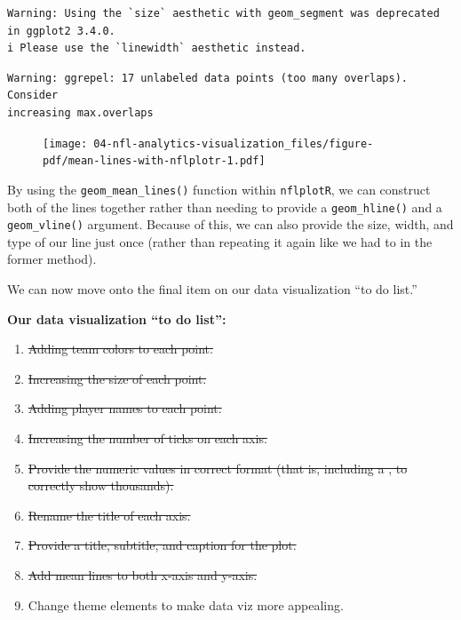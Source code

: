 \documentclass[
  letterpaper,
]{krantz}
\begin{document}
\begin{verbatim}
Warning: Using the `size` aesthetic with geom_segment was deprecated in ggplot2 3.4.0.
i Please use the `linewidth` aesthetic instead.
\end{verbatim}

\begin{verbatim}
Warning: ggrepel: 17 unlabeled data points (too many overlaps). Consider
increasing max.overlaps
\end{verbatim}

\begin{figure}[H]

{\centering \texttt{[image: 04-nfl-analytics-visualization\_files/figure-pdf/mean-lines-with-nflplotr-1.pdf]}

}

\end{figure}

By using the \texttt{geom\_mean\_lines()} function within
\texttt{nflplotR}, we can construct both of the lines together rather
than needing to provide a \texttt{geom\_hline()} and a
\texttt{geom\_vline()} argument. Because of this, we can also provide
the size, width, and type of our line just once (rather than repeating
it again like we had to in the former method).

We can now move onto the final item on our data visualization ``to do
list.''

\begin{tcolorbox}[enhanced jigsaw, left=2mm, toprule=.15mm, opacitybacktitle=0.6, leftrule=.75mm, bottomrule=.15mm, colbacktitle=quarto-callout-note-color!10!white, breakable, colback=white, bottomtitle=1mm, toptitle=1mm, title=\textcolor{quarto-callout-note-color}{\faInfo}\hspace{0.5em}{Note}, coltitle=black, titlerule=0mm, arc=.35mm, opacityback=0, colframe=quarto-callout-note-color-frame, rightrule=.15mm]

\textbf{Our data visualization ``to do list'':}

\begin{enumerate}
\def\labelenumi{\arabic{enumi}.}
\item
  \st{Adding team colors to each point.}
\item
  \st{Increasing the size of each point.}
\item
  \st{Adding player names to each point.}
\item
  \st{Increasing the number of ticks on each axis.}
\item
  \st{Provide the numeric values in correct format (that is, including a
  , to correctly show thousands).}
\item
  \st{Rename the title of each axis.}
\item
  \st{Provide a title, subtitle, and caption for the plot.}
\item
  \st{Add mean lines to both x-axis and y-axis.}
\item
  Change theme elements to make data viz more appealing.
\end{enumerate}

\end{tcolorbox}
\end{document}
